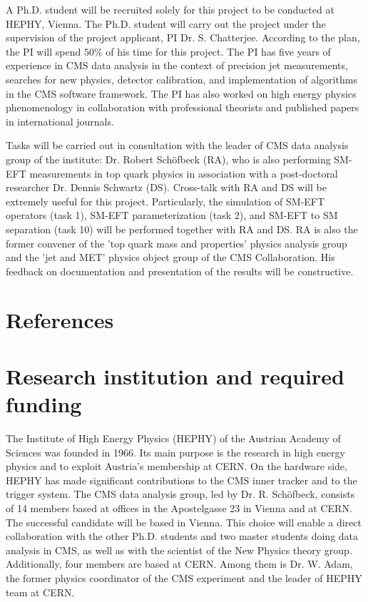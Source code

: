 \documentclass[a4paper,11pt]{article}
\begin{document}
A Ph.D. student will be recruited solely for this project to be conducted at HEPHY, Vienna. 
The Ph.D. student will carry out the project under the supervision of the project applicant, PI Dr. S. Chatterjee. 
According to the plan, the PI will spend $50\%$ of his time for this project. 
The PI has five years of experience in CMS data analysis in the context of precision jet measurements, searches for new physics, detector calibration, and implementation of algorithms in the CMS software framework. 
The PI has also worked on high energy physics phenomenology in collaboration with professional theorists and published papers in international journals. 

Tasks will be carried out in consultation with the leader of CMS data analysis group of the institute: Dr. Robert Sch{\"o}fbeck (RA), who is also performing SM-EFT measurements in top quark physics in association with a post-doctoral researcher Dr. Dennis Schwartz (DS). Cross-talk with RA and DS will be extremely useful for this project. 
Particularly, the simulation of SM-EFT operators (task 1), SM-EFT parameterization (task 2), and SM-EFT to SM separation (task 10) will be performed together with RA and DS. 
RA is also the former convener of the 'top quark mass and properties' physics analysis group and the 'jet and MET' physics object group of the CMS Collaboration. 
His feedback on documentation and presentation of the results will be constructive. 

\appendix
\renewcommand{\thesection}{Annex \arabic{section}} 

\clearpage
\section{References}
\renewcommand{\refname}{}
{


}

\newpage

\section{Research institution and required funding}

The Institute of High Energy Physics (HEPHY) of the Austrian Academy of Sciences was founded in 1966. 
Its main purpose is the research in high energy physics and to exploit Austria's membership at CERN. 
On the hardware side, HEPHY has made significant contributions to the CMS inner tracker and to the trigger system. 
The CMS data analysis group, led by Dr. R. Sch{\"o}fbeck, consists of 14 members based at offices in the Apostelgasse 23 in Vienna and at CERN. The successful candidate will be based in Vienna. 
This choice will enable a direct collaboration with the other Ph.D. students and two master students doing data analysis in CMS, as well as with the scientist of the New Physics theory group.
Additionally, four members are based at CERN. 
Among them is Dr. W. Adam, the former physics coordinator of the CMS experiment and the leader of HEPHY team at CERN.
\end{document}
